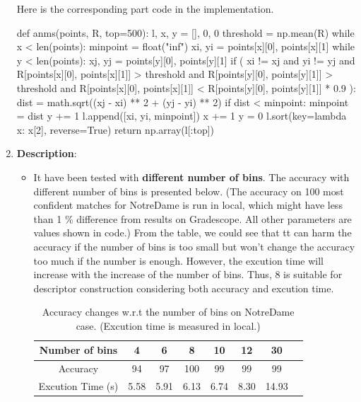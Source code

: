 \begin{enumerate}
    
    Here is the corresponding part code in the implementation.
    \begin{python}
def anms(points, R, top=500):
    l, x, y = [], 0, 0
    threshold = np.mean(R)
    while x < len(points):
        minpoint = float("inf")
        xi, yi = points[x][0], points[x][1]
        while y < len(points):
            xj, yj = points[y][0], points[y][1]
            if (
                xi != xj
                and yi != yj
                and R[points[x][0], points[x][1]] > threshold
                and R[points[y][0], points[y][1]] > threshold
                and R[points[x][0], points[x][1]]
                < R[points[y][0], points[y][1]] * 0.9
            ):
                dist = math.sqrt((xj - xi) ** 2 + (yj - yi) ** 2)
                if dist < minpoint:
                    minpoint = dist
            y += 1
        l.append([xi, yi, minpoint])
        x += 1
        y = 0
    l.sort(key=lambda x: x[2], reverse=True)
    return np.array(l[:top])
    \end{python}
\newpage
    \item \textbf{Description}:
    \begin{itemize}
        \item It have been tested with \textbf{different number of bins}. The accuracy with different number of bins is presented below. (The accuracy on 100 most confident matches for NotreDame is run in local, which might have less than 1 \% difference from results on Gradescope. All other parameters are values shown in code.) From the table, we could see that tt can harm the accuracy if the number of bins is too small but won't change the accuracy too much if the number is enough. However, the excution time will increase with the increase of the number of bins. Thus, 8 is suitable for descriptor construction considering both accuracy and excution time.
       
        \begin{table}[htbp]
            \centering
            \begin{tabular}{c c c c c c c c}
                \toprule
            Number of bins & 4 & 6 & 8 & 10 & 12 & 30 \\
                \midrule
            Accuracy & 94 & 97 & 100 & 99 & 99 & 99 \\
            Excution Time (s) & 5.58 & 5.91 & 6.13 & 6.74 & 8.30  & 14.93 \\
                \bottomrule
            \end{tabular}
            \caption{Accuracy changes w.r.t the number of bins on NotreDame case. (Excution time is measured in local.)}
        \label{bin_number}
        \end{table}



\end{itemize}
\end{enumerate}
